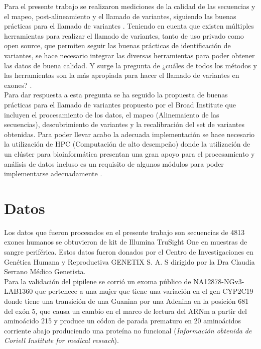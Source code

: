 Para el presente trabajo se realizaron mediciones de la calidad de las secuencias y el mapeo, post-alineamiento y el llamado de variantes, siguiendo las buenas prácticas para el llamado de variantes \cite{Fisch2015}. Teniendo en cuenta que existen múltiples herramientas para realizar el llamado de variantes, tanto de uso privado como open source, que permiten  seguir las buenas prácticas de identificación de variantes, se hace necesario integrar las diversas herramientas para poder obtener las datos de buena calidad. Y surge la pregunta de ¿cuáles de todos los métodos y las herramientas son la más apropiada para hacer el llamado de variantes en exones? \cite{Bao2014}\cite{Cornish2015}. \\

Para dar respuesta a esta pregunta se ha seguido la propuesta de buenas prácticas para el llamado de variantes propuesto por el Broad Institute que incluyen el procesamiento de los datos, el mapeo (Alinemaiento de las secuencias), descubrimiento de variantes y la recalibración del set de variantes obtenidas. Para poder llevar acabo la adecuada implementación se hace necesario la utilización de HPC (Computación de alto desempeño) donde la utilización de un clúster para bioinformática presentan una gran apoyo para el procesamiento y análisis de datos incluso es un requisito de algunos módulos para poder implementarse adecuadamente \cite{Fisch2015}. 

\section{Datos}

Los datos que fueron procesados en el presente trabajo son secuencias de 4813 exones humanos se obtuvieron de kit de Illumina TruSight One en muestras de sangre periférica. Estos datos  fueron donados por el Centro de Investigaciones en Genética Humana y Reproductiva GENETIX S. A. S dirigido por la Dra Claudia Serrano Médico Genetista. \\

Para la validación del pipilene se corrió un exoma público de  NA12878-NGv3-LAB1360 que pertenece a una mujer que tiene una variación en el gen CYP2C19 donde tiene una transición de una Guanina por una Adenina en la posición 681 del exón 5, que causa un cambio en el marco de lectura del ARNm a partir del aminoácido 215 y produce un códon de parada prematuro en 20 aminoácidos corriente abajo produciendo una proteína no funcional (\textit{Información obtenida de Coriell Institute for medical reseach}). \\

